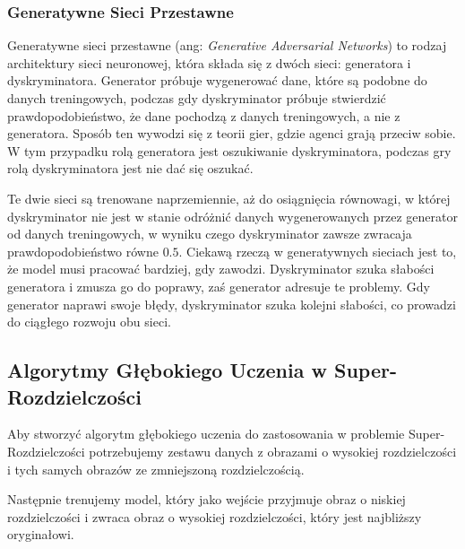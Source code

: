 \subsubsection*{Generatywne Sieci Przestawne}

Generatywne sieci przestawne (ang: \textit{Generative Adversarial Networks}) to rodzaj architektury sieci neuronowej, która składa się z dwóch sieci: generatora i dyskryminatora. Generator próbuje wygenerować dane, które są podobne do danych treningowych, podczas gdy dyskryminator próbuje stwierdzić prawdopodobieństwo, że dane pochodzą z danych treningowych, a nie z generatora.
Sposób ten wywodzi się z teorii gier, gdzie agenci grają przeciw sobie. W tym przypadku rolą generatora jest oszukiwanie dyskryminatora, podczas gry rolą dyskryminatora jest nie dać się oszukać. 

Te dwie sieci są trenowane naprzemiennie, aż do osiągnięcia równowagi, w której dyskryminator nie jest w stanie odróżnić danych wygenerowanych przez generator od danych treningowych, w wyniku czego dyskryminator zawsze zwracaja prawdopodobieństwo równe $0.5$.
Ciekawą rzeczą w generatywnych sieciach jest to, że model musi pracować bardziej, gdy zawodzi. Dyskryminator szuka słabości generatora i zmusza go do poprawy, zaś generator adresuje te problemy. Gdy generator naprawi swoje błędy, dyskryminator szuka kolejni słabości, co prowadzi do ciągłego rozwoju obu sieci.



\subsection*{Algorytmy Głębokiego Uczenia w Super-Rozdzielczości}

Aby stworzyć algorytm głębokiego uczenia do zastosowania w problemie Super-Rozdzielczości potrzebujemy zestawu danych z obrazami o wysokiej rozdzielczości i tych samych obrazów ze zmniejszoną rozdzielczością.

Następnie trenujemy model, który jako wejście przyjmuje obraz o niskiej rozdzielczości i zwraca obraz o wysokiej rozdzielczości, który jest najbliższy oryginałowi.



